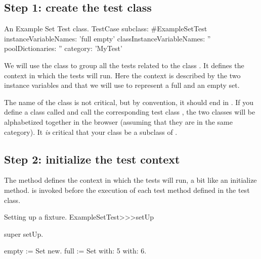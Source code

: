 \documentclass[a4paper,10pt,twoside]{book}
\begin{document}
\subsection{Step 1: create the test class}


\begin{classdef}[exampleSetTest]{An Example Set Test class.}
TestCase subclass: #ExampleSetTest
	instanceVariableNames: 'full empty'
	classInstanceVariableNames: ''
    poolDictionaries: ''
	category: 'MyTest'
\end{classdef}


We will use the class  to group all the tests related to the class .
It defines the context in which the tests will run.
Here the context is described by the two instance variables  and  that we will use to represent a full and an empty set.

The name of the class is not critical, but by convention, it should end in .
If you define a class called  and call the corresponding test class , the two classes will be alphabetized together in the browser (assuming that they are in the same category).
It \emph{is} critical that your class be a subclass of .
\subsection{Step 2: initialize the test context}

The method  defines the context in which the tests will run, a bit like an initialize method.
 is invoked before the execution of each test method defined in the test class.


\begin{method}[setupExampleSetTest]{Setting up a fixture.}
ExampleSetTest>>>setUp

	super setUp.

	empty := Set new.
	full := Set with: 5 with: 6.
\end{method}
\end{document}
